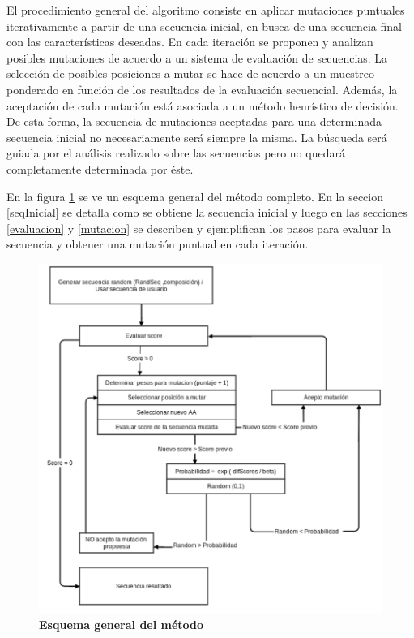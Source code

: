 El procedimiento general del algoritmo consiste en aplicar mutaciones puntuales iterativamente a partir de una secuencia inicial, en busca de una secuencia final con las características deseadas.
En cada iteración se proponen y analizan posibles mutaciones de acuerdo a un sistema de evaluación de secuencias.
La selección de posibles posiciones a mutar se hace de acuerdo a un muestreo ponderado en función de los resultados de la evaluación secuencial.
Además, la aceptación de cada mutación está asociada a un método heurístico de decisión.
De esta forma, la secuencia de mutaciones aceptadas para una determinada secuencia inicial no necesariamente será siempre la misma. La búsqueda será guiada por el análisis realizado sobre las secuencias pero no quedará completamente determinada por éste. 

En la figura \ref{fig:esquema-algoritmo} se ve un esquema general del método completo. 
En la seccion \ref{seqInicial} se detalla como se obtiene la secuencia inicial y luego en las secciones \ref{evaluacion} y \ref{mutacion} se describen y ejemplifican los pasos para evaluar la secuencia y obtener una mutación puntual 
en cada iteración.


\begin{figure}[h!]
\centering
   \includegraphics[width=\textwidth]{img/diagrama-algoritmo-2.png}
 \caption{\textbf{Esquema general del método}}
 \label{fig:esquema-algoritmo}
\end{figure}

